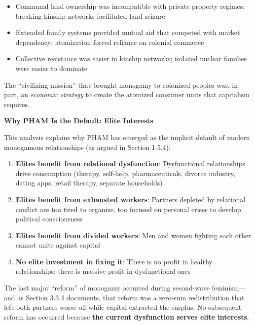 \documentclass[12pt,openany]{book}
\numberwithin{equation}{chapter}
\begin{document}
\begin{itemize}
    \item Communal land ownership was incompatible with private property regimes; breaking kinship networks facilitated land seizure
    \item Extended family systems provided mutual aid that competed with market dependency; atomization forced reliance on colonial commerce
    \item Collective resistance was easier in kinship networks; isolated nuclear families were easier to dominate
\end{itemize}

The ``civilizing mission'' that brought monogamy to colonized peoples was, in part, an \textit{economic strategy} to create the atomized consumer units that capitalism requires.

\textbf{Why PHAM Is the Default: Elite Interests}

This analysis explains why PHAM has emerged as the implicit default of modern monogamous relationships (as argued in Section 1.5.4):

\begin{enumerate}
    \item \textbf{Elites benefit from relational dysfunction}: Dysfunctional relationships drive consumption (therapy, self-help, pharmaceuticals, divorce industry, dating apps, retail therapy, separate households)
    
    \item \textbf{Elites benefit from exhausted workers}: Partners depleted by relational conflict are too tired to organize, too focused on personal crises to develop political consciousness
    
    \item \textbf{Elites benefit from divided workers}: Men and women fighting each other cannot unite against capital
    
    \item \textbf{No elite investment in fixing it}: There is no profit in healthy relationships; there is massive profit in dysfunctional ones
\end{enumerate}

The last major ``reform'' of monogamy occurred during second-wave feminism---and as Section 3.3.4 documents, that reform was a zero-sum redistribution that left both partners worse off while capital extracted the surplus. No subsequent reform has occurred because \textbf{the current dysfunction serves elite interests}.
\end{document}

